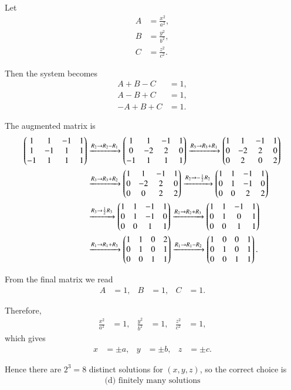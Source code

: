 \documentclass[journal]{IEEEtran}
\begin{document}
\begin{solution}
Let
\begin{align}
A &= \frac{x^2}{a^2}, \\
B &= \frac{y^2}{b^2}, \\
C &= \frac{z^2}{c^2}.
\end{align}

Then the system becomes
\begin{align}
A + B - C &= 1, \\
A - B + C &= 1, \\
- A + B + C &= 1.
\end{align}

The augmented matrix is
\begin{align}
\begin{pmatrix}1 & 1 & -1 & 1 \\ 1 & -1 & 1 & 1 \\ -1 & 1 & 1 & 1\end{pmatrix}
&\xrightarrow{R_2 \to R_2 - R_1}
\begin{pmatrix}1 & 1 & -1 & 1 \\ 0 & -2 & 2 & 0 \\ -1 & 1 & 1 & 1\end{pmatrix} 
\xrightarrow{R_3 \to R_3 + R_1}
\begin{pmatrix}1 & 1 & -1 & 1 \\ 0 & -2 & 2 & 0 \\ 0 & 2 & 0 & 2\end{pmatrix} \notag\\
&\xrightarrow{R_3 \to R_3 + R_2}
\begin{pmatrix}1 & 1 & -1 & 1 \\ 0 & -2 & 2 & 0 \\ 0 & 0 & 2 & 2\end{pmatrix} 
\xrightarrow{R_2 \to -\frac{1}{2} R_2} 
\begin{pmatrix}1 & 1 & -1 & 1 \\ 0 & 1 & -1 & 0 \\ 0 & 0 & 2 & 2\end{pmatrix} \notag\\
&\xrightarrow{R_3 \to \frac{1}{2} R_3} 
\begin{pmatrix}1 & 1 & -1 & 1 \\ 0 & 1 & -1 & 0 \\ 0 & 0 & 1 & 1\end{pmatrix} 
\xrightarrow{R_2 \to R_2 + R_3} 
\begin{pmatrix}1 & 1 & -1 & 1 \\ 0 & 1 & 0 & 1 \\ 0 & 0 & 1 & 1\end{pmatrix} \notag\\
&\xrightarrow{R_1 \to R_1 + R_3} 
\begin{pmatrix}1 & 1 & 0 & 2 \\ 0 & 1 & 0 & 1 \\ 0 & 0 & 1 & 1\end{pmatrix} 
\xrightarrow{R_1 \to R_1 - R_2} 
\begin{pmatrix}1 & 0 & 0 & 1 \\ 0 & 1 & 0 & 1 \\ 0 & 0 & 1 & 1\end{pmatrix}.
\end{align}

From the final matrix we read
\begin{align}
A &= 1, & B &= 1, & C &= 1.
\end{align}

Therefore,
\begin{align}
\frac{x^2}{a^2} &= 1, & \frac{y^2}{b^2} &= 1, & \frac{z^2}{c^2} &= 1,
\end{align}
which gives
\begin{align}
x &= \pm a, & y &= \pm b, & z &= \pm c.
\end{align}

Hence there are $2^3=8$ distinct solutions for $(x,y,z)$, so the correct choice is
\begin{align}
\boxed{\text{(d) finitely many solutions}}
\end{align}
\end{solution}
\end{document}
